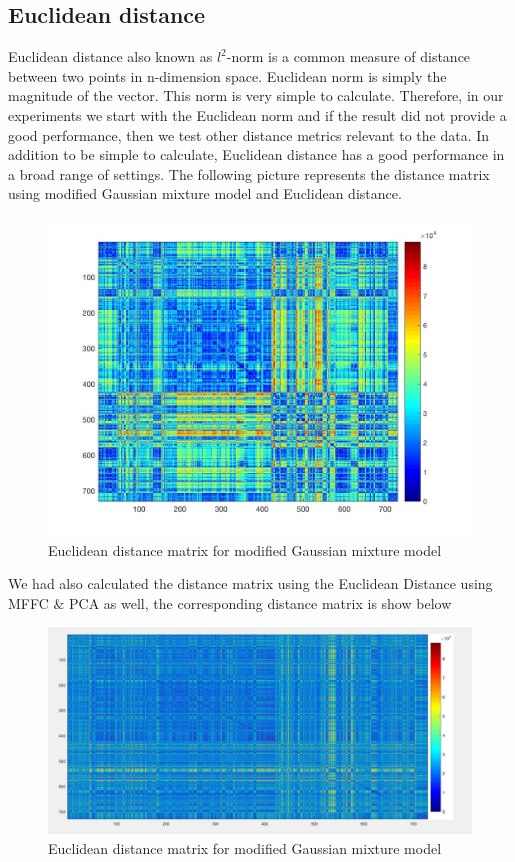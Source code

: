 \documentclass[12pt]{article}
\begin{document}
\subsection{Euclidean distance}
Euclidean distance also known as $l^2$-norm is a common measure of distance between two points in n-dimension space. Euclidean norm is simply the magnitude of the vector. This norm is very simple to calculate. Therefore, in our experiments we start with the Euclidean norm and if the result did not provide a good performance, then we test other distance metrics relevant to the data. In addition to be simple to calculate, Euclidean distance has a good performance in a broad range of settings. The following picture represents the distance matrix using modified Gaussian mixture model and Euclidean distance.
\begin{figure}[H]\label{distMat30}
	\centering
	\includegraphics[width=1\linewidth]{distMat30.jpg}
	\caption{Euclidean distance matrix for modified Gaussian mixture model}
\end{figure}
We had also calculated the distance matrix using the Euclidean Distance using MFFC $\&$ PCA as well, the corresponding distance matrix is show below
\begin{figure}[H]\label{distM20}
	\centering
	\includegraphics[width=1\linewidth]{distM20.png}
	\caption{Euclidean distance matrix for modified Gaussian mixture model}
\end{figure}
\end{document}
